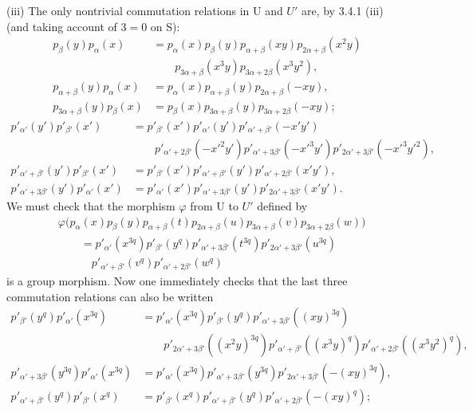 (iii) The only nontrivial commutation relations in U and $U'$ are, by 3.4.1 (iii) (and taking account of $3=0$ on S):
\[
\begin{aligned}
p_\beta(y)p_\alpha(x)&=p_\alpha(x)p_\beta(y)p_{\alpha+\beta}(xy)p_{2\alpha+\beta}(x^2y)\\
&\qquad p_{3\alpha+\beta}(x^3y)p_{3\alpha+2\beta}(x^3y^2),\\
p_{\alpha+\beta}(y)p_\alpha(x)&=p_\alpha(x)p_{\alpha+\beta}(y)p_{2\alpha+\beta}(-xy),\\
p_{3\alpha+\beta}(y)p_\beta(x)&=p_\beta(x)p_{3\alpha+\beta}(y)p_{3\alpha+2\beta}(-xy);
\end{aligned}
\]
\[
\begin{aligned}
p'_{\alpha'}(y')p'_{\beta'}(x')&=p'_{\beta'}(x')p'_{\alpha'}(y')p'_{\alpha'+\beta'}(-x'y')\\
&\qquad p'_{\alpha'+2\beta'}(-x'^2y')p'_{\alpha'+3\beta'}(-x'^3y')p'_{2\alpha'+3\beta'}(-x'^3y'^2),\\
p'_{\alpha'+\beta'}(y')p'_{\beta'}(x')&=p'_{\beta'}(x')p'_{\alpha'+\beta'}(y')p'_{\alpha'+2\beta'}(x'y'),\\
p'_{\alpha'+3\beta'}(y')p'_{\alpha'}(x')&=p'_{\alpha'}(x')p'_{\alpha'+3\beta'}(y')p'_{2\alpha'+3\beta'}(x'y').
\end{aligned}
\]
We must check that the morphism $\varphi$ from U to $U'$ defined by
\[
\begin{aligned}
&\varphi\bigl(p_\alpha(x)p_\beta(y)p_{\alpha+\beta}(t)p_{2\alpha+\beta}(u)p_{3\alpha+\beta}(v)p_{3\alpha+2\beta}(w)\bigr)\\
&\qquad=p'_{\alpha'}(x^{3q})p'_{\beta'}(y^q)p'_{\alpha'+3\beta'}(t^{3q})p'_{2\alpha'+3\beta'}(u^{3q})\\
&\qquad\quad p'_{\alpha'+\beta'}(v^q)p'_{\alpha'+2\beta'}(w^q)
\end{aligned}
\]
is a group morphism. Now one immediately checks that the last three commutation relations can also be written
\[
\begin{aligned}
p'_{\beta'}(y^q)p'_{\alpha'}(x^{3q})&=p'_{\alpha'}(x^{3q})p'_{\beta'}(y^q)p'_{\alpha'+3\beta'}((xy)^{3q})\\
&\qquad p'_{2\alpha'+3\beta'}((x^2y)^{3q})p'_{\alpha'+\beta'}((x^3y)^q)p'_{\alpha'+2\beta'}((x^3y^2)^q),\\
p'_{\alpha'+3\beta'}(y^{3q})p'_{\alpha'}(x^{3q})&=p'_{\alpha'}(x^{3q})p'_{\alpha'+3\beta'}(y^{3q})p'_{2\alpha'+3\beta'}(-(xy)^{3q}),\\
p'_{\alpha'+\beta'}(y^q)p'_{\beta'}(x^q)&=p'_{\beta'}(x^q)p'_{\alpha'+\beta'}(y^q)p'_{\alpha'+2\beta'}(-(xy)^q);
\end{aligned}
\]
